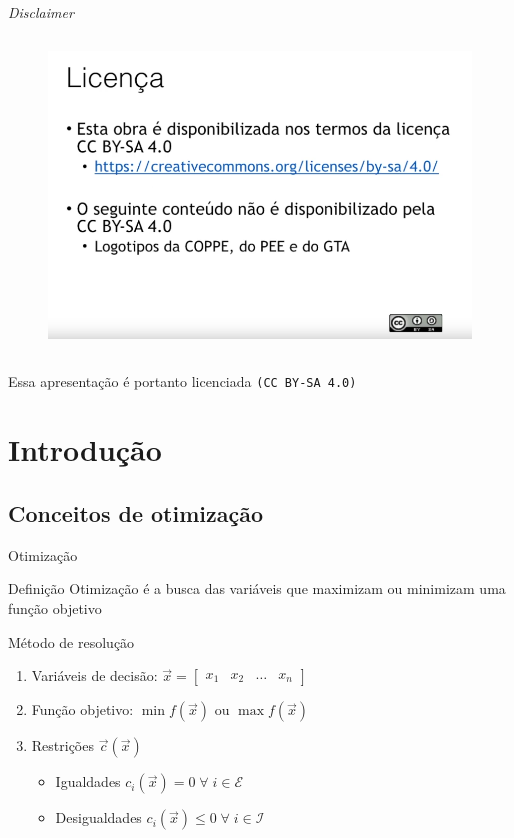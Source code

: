 \documentclass{beamer}
\begin{document}
\begin{frame}{\textit{Disclaimer}}
\begin{columns}
        \begin{figure}
            \centering
            \includegraphics[width=\textwidth]{assets/Introducao/PlaylistRodrigoLicenca.png}
        \end{figure}
    \end{columns}
    \vspace{12pt}
    Essa apresentação é portanto licenciada \texttt{(CC BY-SA 4.0)}
\end{frame}

\section{Introdução}

\subsection*{Conceitos de otimização}

\begin{frame}{Otimização}
    \begin{block}{Definição}
        Otimização é a busca das variáveis que maximizam ou minimizam uma função objetivo
    \end{block}
    \vspace{12pt}
    Método de resolução
    \begin{enumerate}
       \item Variáveis de decisão: $\vec{x}=\begin{bmatrix} x_1 & x_2 & \dots & x_n\end{bmatrix}$
       \item Função objetivo: $\min f(\vec{x})$ ou $\max f(\vec{x})$
       \item Restrições $\vec{c}(\vec{x})$
       \begin{itemize}
           \item Igualdades $c_i(\vec{x})=0\;\forall\;i\in\mathcal{E}$
           \item Desigualdades $c_i(\vec{x})\leq0\;\forall\;i\in\mathcal{I}$
       \end{itemize}
    \end{enumerate}
\end{frame}
\end{document}
